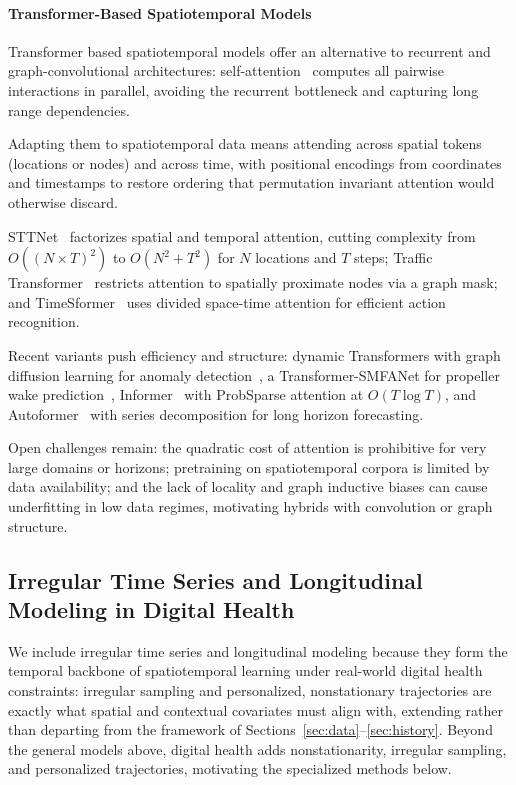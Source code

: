 \documentclass[journal]{IEEEtran}
\providecommand{\Description}[1]{}
\begin{document}
\paragraph{Transformer-Based Spatiotemporal Models}
Transformer based spatiotemporal models offer an alternative to recurrent and graph-convolutional architectures: self-attention~\cite{vaswani2017attention} computes all pairwise interactions in parallel, avoiding the recurrent bottleneck and capturing long range dependencies.
 
Adapting them to spatiotemporal data means attending across spatial tokens (locations or nodes) and across time, with positional encodings from coordinates and timestamps to restore ordering that permutation invariant attention would otherwise discard.
 
STTNet~\cite{xu2020stransformer} factorizes spatial and temporal attention, cutting complexity from $O((N \times T)^2)$ to $O(N^2 + T^2)$ for $N$ locations and $T$ steps; Traffic Transformer~\cite{cai2020traffic} restricts attention to spatially proximate nodes via a graph mask; and TimeSformer~\cite{bertasius2021timesformer} uses divided space-time attention for efficient action recognition.
 
Recent variants push efficiency and structure: dynamic Transformers with graph diffusion learning for anomaly detection~\cite{yu2025graph}, a Transformer-SMFANet for propeller wake prediction~\cite{wang2025propeller}, Informer~\cite{zhou2021informer} with ProbSparse attention at $O(T \log T)$, and Autoformer~\cite{wu2021autoformer} with series decomposition for long horizon forecasting.
 
Open challenges remain: the quadratic cost of attention is prohibitive for very large domains or horizons; pretraining on spatiotemporal corpora is limited by data availability; and the lack of locality and graph inductive biases can cause underfitting in low data regimes, motivating hybrids with convolution or graph structure.
 

 
 
\subsection{Irregular Time Series and Longitudinal Modeling in Digital Health}
We include irregular time series and longitudinal modeling because they form the temporal backbone of spatiotemporal learning under real-world digital health constraints: irregular sampling and personalized, nonstationary trajectories are exactly what spatial and contextual covariates must align with, extending rather than departing from the framework of Sections~\ref{sec:data}--\ref{sec:history}. Beyond the general models above, digital health adds nonstationarity, irregular sampling, and personalized trajectories, motivating the specialized methods below.
\end{document}
